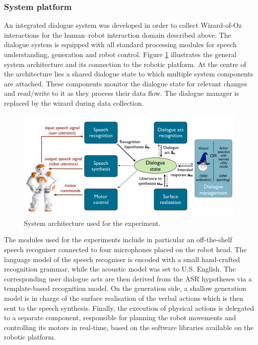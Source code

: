 \subsubsection*{System platform}

An integrated dialogue system was developed in order to collect Wizard-of-Oz interactions for the human--robot interaction domain described above. The dialogue system is equipped with all standard processing modules for speech understanding, generation and robot control.  Figure \ref{fig:exp1_architecture} illustrates the general system architecture and its connection to the robotic platform. At the centre of the architecture lies a shared dialogue state to which multiple system components are attached. These components monitor the dialogue state for relevant changes and read/write to it as they process their data flow. The dialogue manager is replaced by the wizard during data collection. 


\begin{figure}[h]
\begin{center}
\includegraphics[scale=0.30]{imgs/exp1_architecture.pdf}
\end{center}
\caption{System architecture used for the experiment.}
\label{fig:exp1_architecture}
\end{figure}


The modules used for the experiments include in particular an off-the-shelf speech recogniser connected to four microphones placed on the robot head. The language model of the speech recogniser is encoded with a small hand-crafted recognition grammar, while the acoustic model was set to U.S. English. The corresponding user dialogue acts are then derived from the ASR hypotheses via a template-based recognition model. On the generation side, a shallow generation model is in charge of the surface realisation of the verbal actions which is then sent to the speech synthesis.  Finally, the execution of physical actions is delegated to a separate component, responsible for planning the robot movements and controlling its motors in real-time, based on the software libraries available on the robotic platform. 

